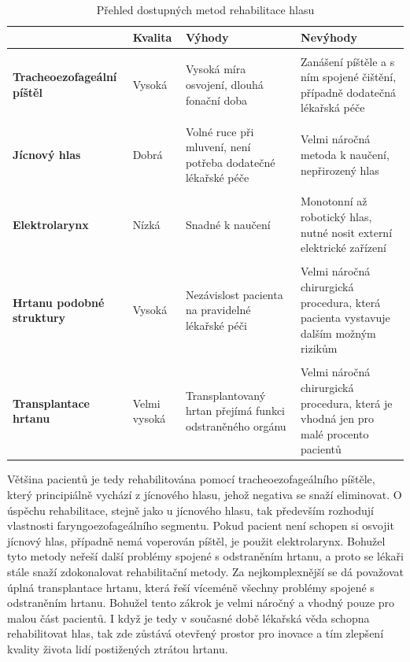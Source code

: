 \begin{table}[ht]
  \centering
  \begin{tabularx}{1.0\textwidth}{L{1.2} L{0.6} L{1.1} L{1.1}}
    & \textbf{Kvalita} & \textbf{Výhody} & \textbf{Nevýhody} \\
    \toprule \\ [-1.75ex]

    \textbf{Tracheoezofageální píštěl} & Vysoká & Vysoká míra osvojení, dlouhá fonační doba & Zanášení píštěle a s ním spojené čištění, případně dodatečná lékařská péče \\
    \midrule \\ [-1.75ex]

    \textbf{Jícnový hlas} & Dobrá & Volné ruce při mluvení, není potřeba dodatečné lékařské péče & Velmi náročná metoda k naučení, nepřirozený hlas \\
    \midrule \\ [-1.75ex]

    \textbf{Elektrolarynx} & Nízká & Snadné k naučení & Monotonní až robotický hlas, nutné nosit externí elektrické zařízení \\
    \midrule \\ [-1.75ex]

    \textbf{Hrtanu podobné struktury} & Vysoká & Nezávislost pacienta na pravidelné lékařské péči & Velmi náročná chirurgická procedura, která pacienta vystavuje dalším možným rizikům  \\
    \midrule \\ [-1.75ex]

    \textbf{Transplantace hrtanu} & Velmi vysoká & Transplantovaný hrtan přejímá funkci odstraněného orgánu & Velmi náročná chirurgická procedura, která je vhodná jen pro malé procento pacientů \\
  \end{tabularx}

  \caption{Přehled dostupných metod rehabilitace hlasu \label{tab:treatment:summary}}
\end{table}

Většina pacientů je tedy rehabilitována pomocí tracheoezofageálního píštěle,
který principiálně vychází z jícnového hlasu, jehož negativa se snaží
eliminovat. O úspěchu rehabilitace, stejně jako u jícnového hlasu, tak
především rozhodují vlastnosti faryngoezofageálního segmentu. Pokud pacient
není schopen si osvojit jícnový hlas, případně nemá voperován píštěl, je
použit elektrolarynx. Bohužel tyto metody neřeší další problémy spojené s
odstraněním hrtanu, a proto se lékaři stále snaží zdokonalovat rehabilitační
metody. Za nejkomplexnější se dá považovat úplná transplantace hrtanu, která
řeší víceméně všechny problémy spojené s odstraněním hrtanu. Bohužel tento
zákrok je velmi náročný a vhodný pouze pro malou část pacientů.
I když je tedy v současné době lékařská věda schopna rehabilitovat hlas, tak
zde zůstává otevřený prostor pro inovace a tím zlepšení kvality života lidí
postižených ztrátou hrtanu.


